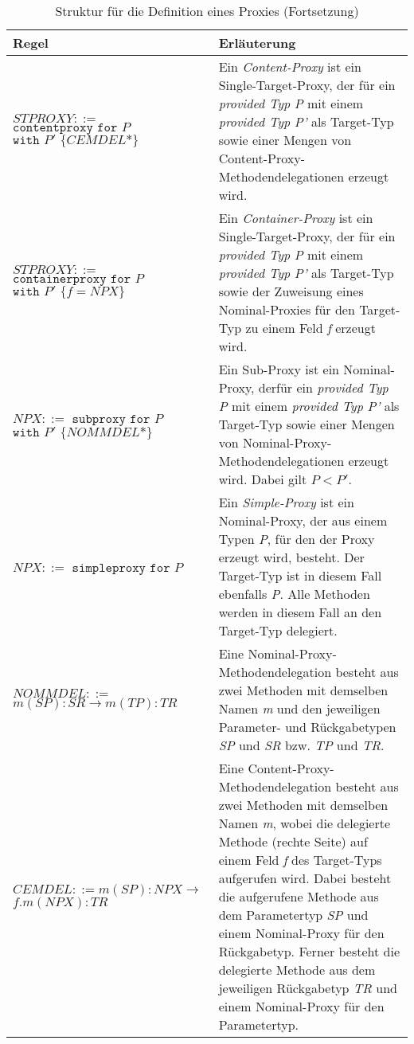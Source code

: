 \documentclass[a4paper,12pt]{article}
\begin{document}
\newpage
\begin{table}[H]
\centering
\begin{tabular}{|p{6cm}|p{8cm}|}
\hline
\centering\textbf{Regel} & \textbf{Erläuterung} \\
\hline
\hline
$\mathit{STPROXY} ::=$\newline $\texttt{contentproxy }  \texttt{for } P$\newline $\texttt{with } P' \texttt{ \{}CEMDEL\text{*}\texttt{\}}$ & Ein \emph{Content-Proxy} ist ein Single-Target-Proxy, der für ein \emph{provided Typ P} mit einem \emph{provided Typ P'} als Target-Typ sowie einer Mengen von Content-Proxy-Methodendelegationen erzeugt wird.\\
\hline
$\mathit{STPROXY} ::=$\newline $\texttt{containerproxy} \texttt{ for } P$\newline
$ \texttt{with } P' \texttt{ \{} f = \mathit{NPX} \texttt{\}}$ &  Ein \emph{Container-Proxy} ist ein Single-Target-Proxy, der für ein \emph{provided Typ P} mit einem \emph{provided Typ P'} als Target-Typ sowie der Zuweisung eines Nominal-Proxies für den Target-Typ zu einem Feld \emph{f} erzeugt wird.\\
\hline
$\mathit{NPX} ::=$ \newline $\texttt{subproxy } \texttt{for } P$\newline $\texttt{with } P' \texttt{ \{}\mathit{NOMMDEL}\text{*\}}$ & Ein Sub-Proxy ist ein Nominal-Proxy, derfür ein \emph{provided Typ P} mit einem \emph{provided Typ P'} als Target-Typ sowie einer Mengen von Nominal-Proxy-Methodendelegationen erzeugt wird. Dabei gilt $P < P'$.\\
\hline
$\mathit{NPX} ::=$ \newline $\texttt{simpleproxy } \texttt{for } P$ & Ein \emph{Simple-Proxy} ist ein Nominal-Proxy, der aus einem Typen \emph{P}, für den der Proxy erzeugt wird, besteht. Der Target-Typ ist in diesem Fall ebenfalls \emph{P}. Alle Methoden werden in diesem Fall an den Target-Typ delegiert.\\
\hline
$\mathit{NOMMDEL} ::=$\newline
$\mathit{m(SP):SR} \rightarrow \mathit{m(TP):TR} $  & Eine Nominal-Proxy-Methodendelegation besteht aus zwei Methoden mit demselben Namen \emph{m} und den jeweiligen Parameter- und Rückgabetypen \emph{SP} und \emph{SR} bzw. \emph{TP} und \emph{TR}. \\
\hline
$\mathit{CEMDEL} ::= \mathit{m(SP):NPX} \rightarrow$\newline
$\mathit{f.m(NPX):TR} $  & Eine Content-Proxy-Methodendelegation besteht aus zwei Methoden mit demselben Namen \emph{m}, wobei die delegierte Methode (rechte Seite) auf einem Feld \emph{f} des Target-Typs aufgerufen wird. Dabei besteht die aufgerufene Methode aus dem Parametertyp \emph{SP} und einem Nominal-Proxy für den Rückgabetyp. Ferner besteht die delegierte Methode aus dem jeweiligen Rückgabetyp \emph{TR} und einem Nominal-Proxy für den Parametertyp.\\
\hline
\hline
\end{tabular}
\caption{Struktur für die Definition eines Proxies (Fortsetzung)}
 \label{tab:eIShort}
\end{table}
\end{document}
